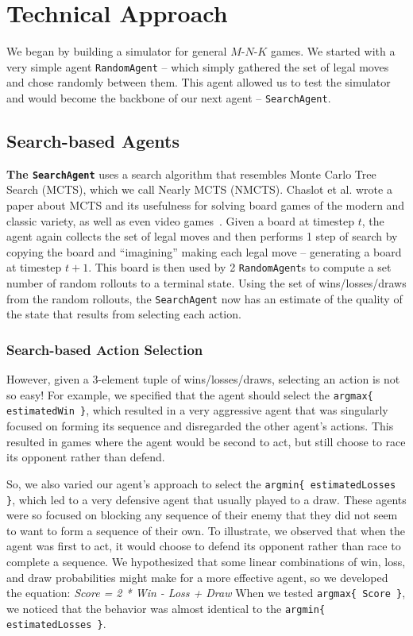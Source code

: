 \section{Technical Approach}

We began by building a simulator for general $M$-$N$-$K$ games.
We started with a very simple agent \texttt{RandomAgent} -- which simply gathered the set of legal moves and chose randomly between them.
This agent allowed us to test the simulator and would become the backbone of our next agent -- \texttt{SearchAgent}.

\subsection{Search-based Agents}

\textbf{The \texttt{SearchAgent}} uses a search algorithm that resembles Monte Carlo Tree Search (MCTS), which we call Nearly MCTS (NMCTS).
Chaslot et al. wrote a paper about MCTS and its usefulness for solving board games of the modern and classic variety, as well as even video games~\cite{chaslot2008monte}.
Given a board at timestep $t$, the agent again collects the set of legal moves and then performs 1 step of search by copying the board and ``imagining'' making each legal move -- generating a board at timestep $t+1$.
This board is then used by 2 \texttt{RandomAgent}s to compute a set number of random rollouts to a terminal state.
Using the set of wins/losses/draws from the random rollouts, the \texttt{SearchAgent} now has an estimate of the quality of the state that results from selecting each action.



\subsubsection{Search-based Action Selection}

However, given a 3-element tuple of wins/losses/draws, selecting an action is not so easy!
For example, we specified that the agent should select the \texttt{argmax\{ estimatedWin \}}, which resulted in a very aggressive agent that was singularly focused on forming its sequence and disregarded the other agent's actions.
This resulted in games where the agent would be second to act, but still choose to race its opponent rather than defend.



So, we also varied our agent's approach to select the \texttt{argmin\{ estimatedLosses \}}, which led to a very defensive agent that usually played to a draw.
These agents were so focused on blocking any sequence of their enemy that they did not seem to want to form a sequence of their own.
To illustrate, we observed that when the agent was first to act, it would choose to defend its opponent rather than race to complete a sequence.
We hypothesized that some linear combinations of win, loss, and draw probabilities might make for a more effective agent, so we developed the equation:
\emph{Score = 2 * Win - Loss + Draw}
When we tested \texttt{argmax\{ Score \}}, we noticed that the behavior was almost identical to the \texttt{argmin\{ estimatedLosses \}}.


